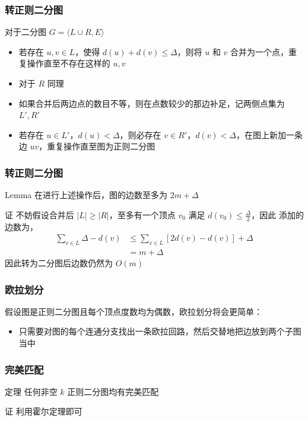 \documentclass[UTF8]{beamer}
\begin{document}


\begin{frame}
  \frametitle{转正则二分图}
  对于二分图 $G = \langle L \cup R, E \rangle$
  \begin{itemize}
    \item 若存在 $u, v \in L$，使得 $d(u) + d(v) \leq \Delta$，则将 $u$ 和 $v$ 合并为一个点，重复操作直至不存在这样的 $u, v$
    \item 对于 $R$ 同理
    \item 如果合并后两边点的数目不等，则在点数较少的那边补足，记两侧点集为 $L', R'$
    \item 若存在 $u \in L'$，$d(u) < \Delta$，则必存在 $v \in R'$，$d(v) < \Delta$，在图上新加一条边 $u v$，重复操作直至图为正则二分图
  \end{itemize}
\end{frame}

\begin{frame}
  \frametitle{转正则二分图}
  \begin{block}{Lemma}
    在进行上述操作后，图的边数至多为 $2m + \Delta$
  \end{block}
  \begin{block}{证}
    不妨假设合并后 $|L| \geq |R|$，至多有一个顶点 $v_0$ 满足 $d(v_0) \leq \frac{\Delta}{2}$，因此
    添加的边数为，
    \[\begin{aligned}
      \sum_{v\in L} \Delta - d(v) &\leq \sum_{v \in L} [2d(v) - d(v)] + \Delta\\
      &=m+\Delta
    \end{aligned}\]
    因此转为二分图后边数仍然为 $O(m)$
  \end{block}
\end{frame}

\begin{frame}
  \frametitle{欧拉划分}

  假设图是正则二分图且每个顶点度数均为偶数，欧拉划分将会更简单：
  \begin{itemize}
    \item 只需要对图的每个连通分支找出一条欧拉回路，然后交替地把边放到两个子图当中
  \end{itemize}

\end{frame}

\begin{frame}
  \frametitle{完美匹配}

  \begin{block}{定理}
    任何非空 $k$ 正则二分图均有完美匹配
  \end{block}

  \begin{block}{证}
    利用霍尔定理即可
  \end{block}
\end{frame}
\end{document}
